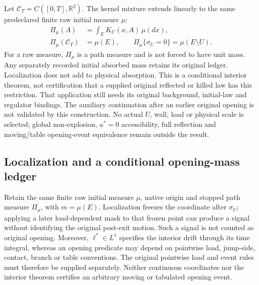 \documentclass[11pt]{article}
\begin{document}
Let $\mathcal C_T=C([0,T],\mathbb R^2)$. The kernel mixture extends
linearly to the same predeclared finite raw initial measure $\mu$:
\begin{equation}
\begin{aligned}
 \Pi_\mu(A)&=\int_E K_U(x,A)\,\mu(dx),\\
 \Pi_\mu(\mathcal C_T)&=\mu(E),\qquad
 \Pi_\mu\{\sigma_U=0\}=\mu(E\setminus U).
\end{aligned}
\end{equation}
For a raw measure, $\Pi_\mu$ is a path measure and is not forced to have
unit mass. Any separately recorded initial absorbed mass retains its
original ledger. Localization does not add to physical absorption.
This is a conditional interior theorem, not certification that a supplied
original reflected or killed law has this restriction. That application
still needs its original background, initial-law and regulator bindings.
The auxiliary continuation after an earlier original opening is not
validated by this construction. No actual $U$, wall, load or physical
scale is selected; global non-explosion, $a^*=0$ accessibility, full
reflection and moving/table opening-event equivalence remain outside
the result.


\subsection{Localization and a conditional opening-mass ledger}
Retain the same finite raw initial measure $\mu$, native origin and
stopped path measure $\Pi_\mu$, with $m=\mu(E)$. Localization freezes
the coordinate after $\sigma_U$; applying a later load-dependent mask to
that frozen point can produce a signal without identifying the original
post-exit motion. Such a signal is not counted as original opening.
Moreover, $\ell^*\in L^1$ specifies the interior drift through its time
integral, whereas an opening predicate may depend on pointwise load,
jump-side, contact, branch or table conventions. The original pointwise
load and event rules must therefore be supplied separately. Neither
continuous coordinates nor the interior theorem certifies an arbitrary
moving or tabulated opening event.
\end{document}
